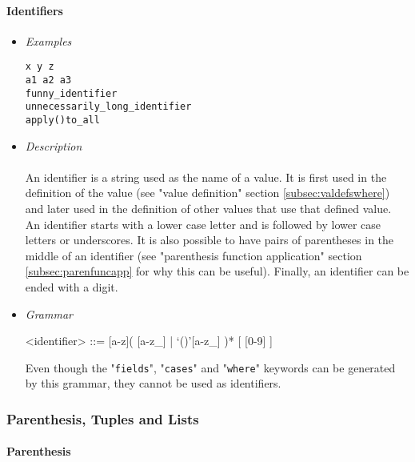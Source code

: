 \documentclass{article}
\begin{document}
\paragraph{Identifiers}
\begin{itemize}

\item \textit{Examples}
\begin{verbatim}
x y z
a1 a2 a3 
funny_identifier 
unnecessarily_long_identifier
apply()to_all
\end{verbatim}

\item \textit{Description} \\\\
An identifier is a string used as the name of a value. It is first used in the
definition of the value (see "value definition" section \ref{subsec:valdefswhere})
and later used in the definition of other values that use that defined value.
An identifier starts with a lower case letter and is followed by lower case
letters or underscores. It is also possible to have pairs of parentheses in the
middle of an identifier (see "parenthesis function application" section
\ref{subsec:parenfuncapp} for why this can be useful). Finally, an identifier
can be ended with a digit.

\item \textit{Grammar}
\begin{grammar}
<identifier> ::= [a-z]( [a-z_] | `()'[a-z_] )* [ [0-9] ]
\end{grammar}
Even though the "\texttt{fields}", "\texttt{cases}" and "\texttt{where}"
keywords can be generated by this grammar, they cannot be used as identifiers.

\end{itemize}

\newpage
\subsubsection{Parenthesis, Tuples and Lists}

\paragraph{Parenthesis}
\end{document}
